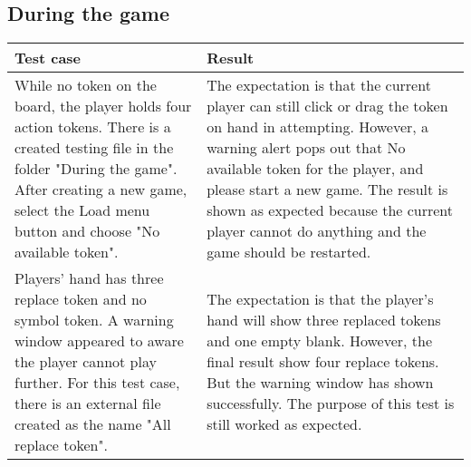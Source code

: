 \newpage
\subsection{During the game}

\begin{table}[h]
	\centering
	\begin{tabular}{p{7cm}@{\hskip 5mm}  p{7cm}} 
		\toprule
		Test case   & Result   \\ 
		\midrule
		\midrule
        While no token on the board, the player holds four action tokens. There is a created testing file in the folder "During the game". After creating a new game, select the Load menu button and choose "No available token".  & The expectation is that the current player can still click or drag the token on hand in attempting. However, a warning alert pops out that No available token for the player, and please start a new game.  The result is shown as expected because the current player cannot do anything and the game should be restarted.   \\ 
        \midrule
        Players' hand has three replace token and no symbol token. A warning window appeared to aware the player cannot play further. For this test case, there is an external file created as the name "All replace token". & The expectation is that the player's hand will show three replaced tokens and one empty blank. However, the final result show four replace tokens. But the warning window has shown successfully. The purpose of this test is still worked as expected. \\
		\bottomrule
	\end{tabular}
\end{table}